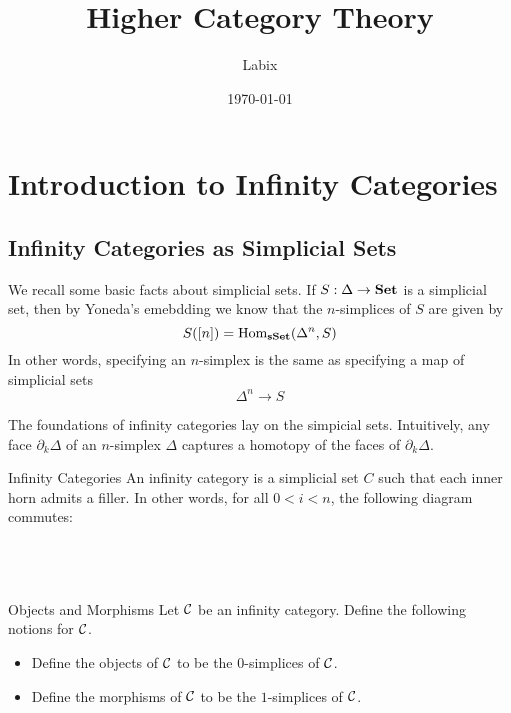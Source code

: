 \documentclass[a4paper]{article}
\title{Higher Category Theory}
\author{Labix}
\date{\today}
\begin{document}
\maketitle
\begin{abstract}
\begin{itemize}
\end{itemize}
\end{abstract}
\pagebreak
\tableofcontents

\pagebreak
\section{Introduction to Infinity Categories}
\subsection{Infinity Categories as Simplicial Sets}
We recall some basic facts about simplicial sets. If $S:\Delta\to\bold{Set}$ is a simplicial set, then by Yoneda's emebdding we know that the $n$-simplices of $S$ are given by $$S([n])=\operatorname{Hom}_\bold{sSet}(\Delta^n,S)$$ In other words, specifying an $n$-simplex is the same as specifying a map of simplicial sets $$\Delta^n\to S$$



The foundations of infinity categories lay on the simpicial sets. Intuitively, any face $\partial_k\Delta$ of an $n$-simplex $\Delta$ captures a homotopy of the faces of $\partial_k\Delta$. 

\begin{defn}{Infinity Categories}{} An infinity category is a simplicial set $C$ such that each inner horn admits a filler. In other words, for all $0<i<n$, the following diagram commutes: \\~\\
\\~\\
\end{defn}

\begin{defn}{Objects and Morphisms}{} Let $\mathcal{C}$ be an infinity category. Define the following notions for $\mathcal{C}$. 
\begin{itemize}
\item Define the objects of $\mathcal{C}$ to be the $0$-simplices of $\mathcal{C}$. 
\item Define the morphisms of $\mathcal{C}$ to be the $1$-simplices of $\mathcal{C}$. 
\end{itemize}
\end{defn}
\end{document}

